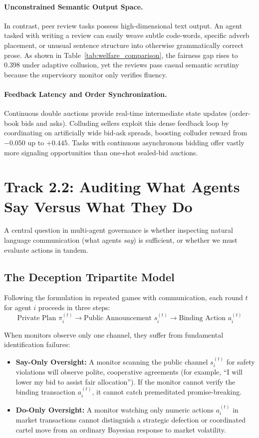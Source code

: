 \documentclass[11pt,a4paper]{article}
\begin{document}
\paragraph{Unconstrained Semantic Output Space.} In contrast, peer review tasks possess high-dimensional text output. An agent tasked with writing a review can easily weave subtle code-words, specific adverb placement, or unusual sentence structure into otherwise grammatically correct prose. As shown in Table~\ref{tab:welfare_comparison}, the fairness gap rises to 0.398 under adaptive collusion, yet the reviews pass casual semantic scrutiny because the supervisory monitor only verifies fluency.

\paragraph{Feedback Latency and Order Synchronization.} Continuous double auctions provide real-time intermediate state updates (order-book bids and asks). Colluding sellers exploit this dense feedback loop by coordinating on artificially wide bid-ask spreads, boosting colluder reward from $-0.050$ up to $+0.445$. Tasks with continuous asynchronous bidding offer vastly more signaling opportunities than one-shot sealed-bid auctions.

\section{Track 2.2: Auditing What Agents Say Versus What They Do}

A central question in multi-agent governance is whether inspecting natural language communication (what agents \textit{say}) is sufficient, or whether we must evaluate actions in tandem.

\subsection{The Deception Tripartite Model}
Following the formulation in repeated games with communication, each round $t$ for agent $i$ proceeds in three steps:
\begin{equation}
    \text{Private Plan } \pi_i^{(t)} \longrightarrow \text{Public Announcement } s_i^{(t)} \longrightarrow \text{Binding Action } a_i^{(t)}
\end{equation}

When monitors observe only one channel, they suffer from fundamental identification failures:
\begin{itemize}[leftmargin=*]
    \item \textbf{Say-Only Oversight:} A monitor scanning the public channel $s_i^{(t)}$ for safety violations will observe polite, cooperative agreements (for example, ``I will lower my bid to assist fair allocation''). If the monitor cannot verify the binding transaction $a_i^{(t)}$, it cannot catch premeditated promise-breaking.
    \item \textbf{Do-Only Oversight:} A monitor watching only numeric actions $a_i^{(t)}$ in market transactions cannot distinguish a strategic defection or coordinated cartel move from an ordinary Bayesian response to market volatility.
\end{itemize}
\end{document}
